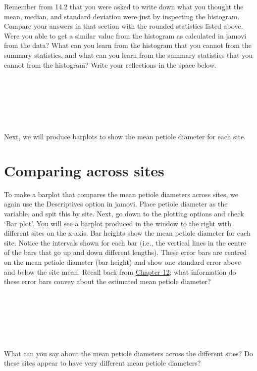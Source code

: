 \documentclass[
  openany]{scrbook}
\begin{document}
Remember from 14.2 that you were asked to write down what you thought the mean, median, and standard deviation were just by inspecting the histogram.
Compare your answers in that section with the rounded statistics listed above.
Were you able to get a similar value from the histogram as calculated in jamovi from the data?
What can you learn from the histogram that you cannot from the summary statistics, and what can you learn from the summary statistics that you cannot from the histogram?
Write your reflections in the space below.

\begin{verbatim}






\end{verbatim}

Next, we will produce barplots to show the mean petiole diameter for each site.

\hypertarget{comparing-across-sites}{%
\section{Comparing across sites}\label{comparing-across-sites}}

To make a barplot that compares the mean petiole diameters across sites, we again use the Descriptives option in jamovi.
Place petiole diameter as the variable, and spit this by site.
Next, go down to the plotting options and check `Bar plot'.
You will see a barplot produced in the window to the right with different sites on the x-axis.
Bar heights show the mean petiole diameter for each site.
Notice the intervals shown for each bar (i.e., the vertical lines in the centre of the bars that go up and down different lengths).
These error bars are centred on the mean petiole diameter (bar height) and show one standard error above and below the site mean.
Recall back from \protect\hyperlink{Chapter_12}{Chapter 12}; what information do these error bars convey about the estimated mean petiole diameter?

\begin{verbatim}






\end{verbatim}

What can you say about the mean petiole diameters across the different sites?
Do these sites appear to have very different mean petiole diameters?

\begin{verbatim}






\end{verbatim}
\end{document}
